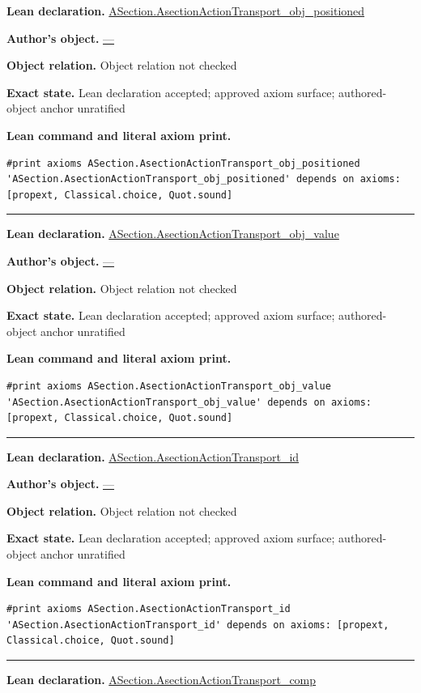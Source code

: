 \documentclass[11pt]{article}
\theoremstyle{plain}
\theoremstyle{definition}
\theoremstyle{remark}
\begin{document}
\begin{tcolorbox}
\textbf{Lean declaration.} \url{ASection.AsectionActionTransport_obj_positioned}
\par\textbf{Author's object.} \url{—}
\par\textbf{Object relation.} Object relation not checked
\par\textbf{Exact state.} Lean declaration accepted; approved axiom surface; authored-object anchor unratified
\par\smallskip\textbf{Lean command and literal axiom print.}
\begin{Verbatim}[breaklines=true,breakanywhere=true,fontsize=\small]
#print axioms ASection.AsectionActionTransport_obj_positioned
'ASection.AsectionActionTransport_obj_positioned' depends on axioms: [propext, Classical.choice, Quot.sound]
\end{Verbatim}
\medskip\hrule\medskip
\textbf{Lean declaration.} \url{ASection.AsectionActionTransport_obj_value}
\par\textbf{Author's object.} \url{—}
\par\textbf{Object relation.} Object relation not checked
\par\textbf{Exact state.} Lean declaration accepted; approved axiom surface; authored-object anchor unratified
\par\smallskip\textbf{Lean command and literal axiom print.}
\begin{Verbatim}[breaklines=true,breakanywhere=true,fontsize=\small]
#print axioms ASection.AsectionActionTransport_obj_value
'ASection.AsectionActionTransport_obj_value' depends on axioms: [propext, Classical.choice, Quot.sound]
\end{Verbatim}
\medskip\hrule\medskip
\textbf{Lean declaration.} \url{ASection.AsectionActionTransport_id}
\par\textbf{Author's object.} \url{—}
\par\textbf{Object relation.} Object relation not checked
\par\textbf{Exact state.} Lean declaration accepted; approved axiom surface; authored-object anchor unratified
\par\smallskip\textbf{Lean command and literal axiom print.}
\begin{Verbatim}[breaklines=true,breakanywhere=true,fontsize=\small]
#print axioms ASection.AsectionActionTransport_id
'ASection.AsectionActionTransport_id' depends on axioms: [propext, Classical.choice, Quot.sound]
\end{Verbatim}
\medskip\hrule\medskip
\textbf{Lean declaration.} \url{ASection.AsectionActionTransport_comp}

\end{tcolorbox}
\end{document}
